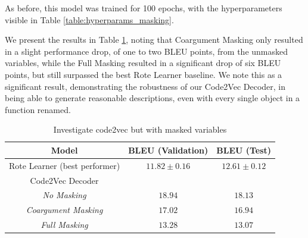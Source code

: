 As before, this model was trained for 100 epochs, with the hyperparameters visible in Table \ref{table:hyperparams_masking}.

We present the results in Table \ref{table:code_2_vec_masked}, noting that Coargument Masking only resulted in a slight performance drop, of one to two BLEU points, from the unmasked variables, while the Full Masking resulted in a significant drop of six BLEU points, but still surpassed the best Rote Learner baseline. 
We note this as a significant result, demonstrating the robustness of our Code2Vec Decoder, in being able to generate reasonable descriptions, even with every single object in a function renamed.



\begin{table}[ht!]
\begin{center}
\begin{tabular}{ c | c | c }
    Model                             & BLEU (Validation)  & BLEU (Test)    \\
    \hline
    Rote Learner (best performer)          & $ 11.82 \pm  0.16 $ & $ 12.61 \pm 0.12 $ \\
    \hline
    Code2Vec  Decoder                             &  &  \\
    \textit{No Masking}                               & $ 18.94 $ & $ 18.13$ \\
    \textit{Coargument Masking}              & $ 17.02 $ & $ 16.94 $ \\                  
    \textit{Full Masking}                & $ 13.28 $ & $ 13.07 $ \\
    \hline
\end{tabular}
\caption {Investigate code2vec but with masked variables}
\label{table:code_2_vec_masked}
\end{center}
\end{table}


